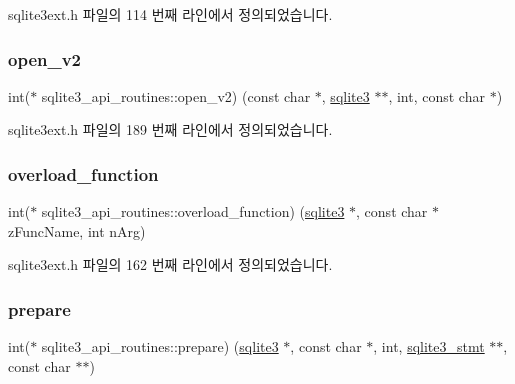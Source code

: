 sqlite3ext.\+h 파일의 114 번째 라인에서 정의되었습니다.

\mbox{\label{structsqlite3__api__routines_a1e6684ec7752ca3aea64da0049490083}} 
\subsubsection{\texorpdfstring{open\+\_\+v2}{open\_v2}}
{\footnotesize\ttfamily int($\ast$ sqlite3\+\_\+api\+\_\+routines\+::open\+\_\+v2) (const char $\ast$, \hyperlink{sqlite3_8h_a0ef6f2646262c8a9b24368d8ac140f69}{sqlite3} $\ast$$\ast$, int, const char $\ast$)}



sqlite3ext.\+h 파일의 189 번째 라인에서 정의되었습니다.

\mbox{\label{structsqlite3__api__routines_a44b969d18a0986e9cef7bc8b8b35e1c2}} 
\subsubsection{\texorpdfstring{overload\+\_\+function}{overload\_function}}
{\footnotesize\ttfamily int($\ast$ sqlite3\+\_\+api\+\_\+routines\+::overload\+\_\+function) (\hyperlink{sqlite3_8h_a0ef6f2646262c8a9b24368d8ac140f69}{sqlite3} $\ast$, const char $\ast$z\+Func\+Name, int n\+Arg)}



sqlite3ext.\+h 파일의 162 번째 라인에서 정의되었습니다.

\mbox{\label{structsqlite3__api__routines_a506ea7218da25d4973721f4770ce8dc7}} 
\subsubsection{\texorpdfstring{prepare}{prepare}}
{\footnotesize\ttfamily int($\ast$ sqlite3\+\_\+api\+\_\+routines\+::prepare) (\hyperlink{sqlite3_8h_a0ef6f2646262c8a9b24368d8ac140f69}{sqlite3} $\ast$, const char $\ast$, int, \hyperlink{sqlite3_8h_af2a033da1327cdd77f0a174a09aedd0c}{sqlite3\+\_\+stmt} $\ast$$\ast$, const char $\ast$$\ast$)}



